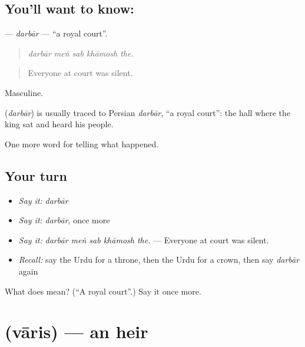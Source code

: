 \subsection*{You'll want to know: }
\textbf{} — \emph{darbār} — \textquotedblleft{}a royal court\textquotedblright{}.

\begin{quote}
    
\end{quote}

\begin{quote}
\emph{darbār meṅ sab khāmosh the.}
\end{quote}

\begin{quote}
Everyone at court was silent.
\end{quote}

Masculine.

\begin{cousinweb}
\textbf{} (\emph{darbār}) is usually traced to Persian \emph{darbār}, \textquotedblleft{}a royal court\textquotedblright{}: the hall where the king sat and heard his people.
\end{cousinweb}

\begin{grammarlens}[title={What you've built}]
One more word for telling what happened.
\end{grammarlens}

\subsection*{Your turn}
\begin{itemize}
\raggedright
  \item \emph{Say it:} \emph{darbār}
  \item \emph{Say it:} \emph{darbār}, once more
  \item \emph{Say it:} \emph{darbār meṅ sab khāmosh the.} — Everyone at court was silent.
  \item \emph{Recall:} say the Urdu for a throne, then the Urdu for a crown, then say \emph{darbār} again
\end{itemize}

\begin{tcolorbox}[breakable,colback=teal!4,colframe=teal!35!black,title={Before you move on}]
What does  mean? (\textquotedblleft{}A royal court\textquotedblright{}.) Say it once more.
\end{tcolorbox}
\section[\texorpdfstring{\ur{وارث} (vāris)}{وارث (vāris)}]{ (vāris) — an heir}


